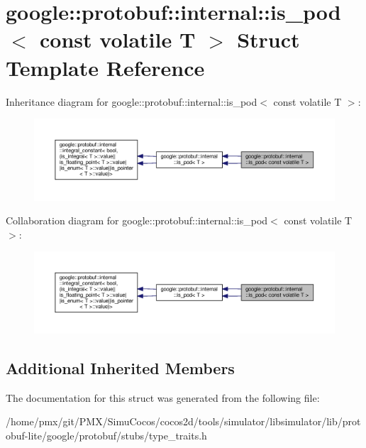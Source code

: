 \hypertarget{structgoogle_1_1protobuf_1_1internal_1_1is__pod_3_01const_01volatile_01T_01_4}{}\section{google\+:\+:protobuf\+:\+:internal\+:\+:is\+\_\+pod$<$ const volatile T $>$ Struct Template Reference}
\label{structgoogle_1_1protobuf_1_1internal_1_1is__pod_3_01const_01volatile_01T_01_4}


Inheritance diagram for google\+:\+:protobuf\+:\+:internal\+:\+:is\+\_\+pod$<$ const volatile T $>$\+:
\nopagebreak
\begin{figure}[H]
\begin{center}
\leavevmode
\includegraphics[width=350pt]{structgoogle_1_1protobuf_1_1internal_1_1is__pod_3_01const_01volatile_01T_01_4__inherit__graph}
\end{center}
\end{figure}


Collaboration diagram for google\+:\+:protobuf\+:\+:internal\+:\+:is\+\_\+pod$<$ const volatile T $>$\+:
\nopagebreak
\begin{figure}[H]
\begin{center}
\leavevmode
\includegraphics[width=350pt]{structgoogle_1_1protobuf_1_1internal_1_1is__pod_3_01const_01volatile_01T_01_4__coll__graph}
\end{center}
\end{figure}
\subsection*{Additional Inherited Members}


The documentation for this struct was generated from the following file\+:\begin{DoxyCompactItemize}
\item 
/home/pmx/git/\+P\+M\+X/\+Simu\+Cocos/cocos2d/tools/simulator/libsimulator/lib/protobuf-\/lite/google/protobuf/stubs/type\+\_\+traits.\+h\end{DoxyCompactItemize}
